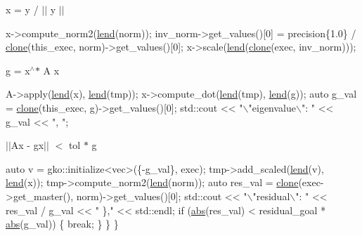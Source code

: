 x = y / $\vert$$\vert$ y $\vert$$\vert$


\begin{DoxyCode}
x->compute\_norm2(\hyperlink{namespacegko_aa8cb4876b72e5e1036ea9575443c439b}{lend}(norm));
inv\_norm->get\_values()[0] =
    precision\{1.0\} / \hyperlink{namespacegko_a1beb80750459e4201aa9d882d2d074c3}{clone}(this\_exec, norm)->get\_values()[0];
x->scale(\hyperlink{namespacegko_aa8cb4876b72e5e1036ea9575443c439b}{lend}(\hyperlink{namespacegko_a1beb80750459e4201aa9d882d2d074c3}{clone}(exec, inv\_norm)));
\end{DoxyCode}


g = x$^\wedge$$\ast$ A x


\begin{DoxyCode}
A->apply(\hyperlink{namespacegko_aa8cb4876b72e5e1036ea9575443c439b}{lend}(x), \hyperlink{namespacegko_aa8cb4876b72e5e1036ea9575443c439b}{lend}(tmp));
x->compute\_dot(\hyperlink{namespacegko_aa8cb4876b72e5e1036ea9575443c439b}{lend}(tmp), \hyperlink{namespacegko_aa8cb4876b72e5e1036ea9575443c439b}{lend}(g));
\textcolor{keyword}{auto} g\_val = \hyperlink{namespacegko_a1beb80750459e4201aa9d882d2d074c3}{clone}(this\_exec, g)->get\_values()[0];
std::cout << \textcolor{stringliteral}{"\(\backslash\)"eigenvalue\(\backslash\)": "} << g\_val << \textcolor{stringliteral}{", "};
\end{DoxyCode}


$\vert$$\vert$\+Ax -\/ gx$\vert$$\vert$ $<$ tol $\ast$ g


\begin{DoxyCode}
        \textcolor{keyword}{auto} v = gko::initialize<vec>(\{-g\_val\}, exec);
        tmp->add\_scaled(\hyperlink{namespacegko_aa8cb4876b72e5e1036ea9575443c439b}{lend}(v), \hyperlink{namespacegko_aa8cb4876b72e5e1036ea9575443c439b}{lend}(x));
        tmp->compute\_norm2(\hyperlink{namespacegko_aa8cb4876b72e5e1036ea9575443c439b}{lend}(norm));
        \textcolor{keyword}{auto} res\_val = \hyperlink{namespacegko_a1beb80750459e4201aa9d882d2d074c3}{clone}(exec->get\_master(), norm)->get\_values()[0];
        std::cout << \textcolor{stringliteral}{"\(\backslash\)"residual\(\backslash\)": "} << res\_val / g\_val << \textcolor{stringliteral}{" \},"} << std::endl;
        \textcolor{keywordflow}{if} (\hyperlink{namespacegko_a57797fc0a00fd4b7ff34ca4bfc84bc51}{abs}(res\_val) < residual\_goal * \hyperlink{namespacegko_a57797fc0a00fd4b7ff34ca4bfc84bc51}{abs}(g\_val)) \{
            \textcolor{keywordflow}{break};
        \}
    \}
\}
\end{DoxyCode}
 \label{_Results}%
